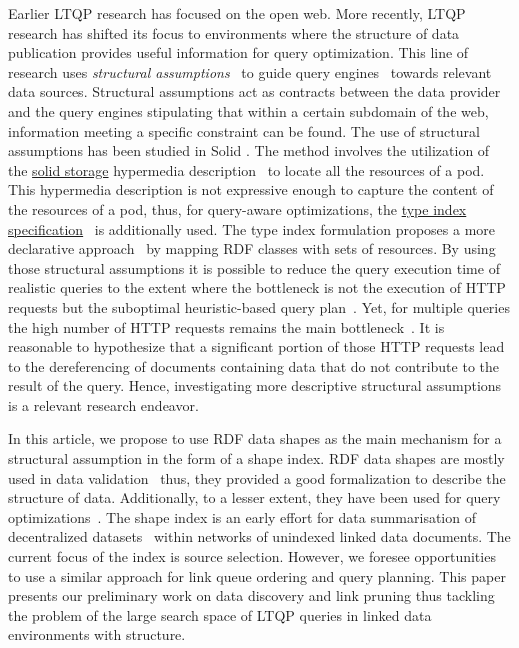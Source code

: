 Earlier LTQP research has focused on the open web.
More recently, LTQP research has shifted its focus to environments where the structure of data publication provides useful information for query optimization.
This line of research uses \emph{structural assumptions}~\cite{Taelman2023} to guide query engines~\cite{verborgh2020guided} towards relevant data sources.
Structural assumptions act as contracts between the data provider and the query engines stipulating that within a certain subdomain of the web, information meeting a specific constraint can be found.
The use of structural assumptions has been studied in Solid \cite{Taelman2023}.
The method involves the utilization of the 
\href{https://solidproject.org/TR/protocol#resources}{solid storage} hypermedia description~\cite{Fielding} to locate all the resources of a pod. 
This hypermedia description is not expressive enough to capture the content of the resources of a pod, thus, for query-aware optimizations, the \href{https://solid.github.io/type-indexes/}{type index specification}~ is additionally used.
The type index formulation proposes a more declarative approach~\cite{Taelman2017} by mapping RDF classes with sets of resources.
By using those structural assumptions it is possible to reduce the query execution time of realistic queries to the extent where the bottleneck is not the execution of HTTP requests but the suboptimal heuristic-based query plan~\cite{eschauzier_quweda_2023, Taelman2023}.
Yet, for multiple queries the high number of HTTP requests remains the main bottleneck~\cite{eschauzier_quweda_2023}.
It is reasonable to hypothesize that a significant portion of those HTTP requests lead to the dereferencing of documents containing data that do not contribute to the result of the query.
Hence, investigating more descriptive structural assumptions is a relevant research endeavor.

In this article, we propose to use RDF data shapes as the main mechanism for a structural assumption in the form of a shape index.
RDF data shapes are mostly used in data validation~\cite{Gayo2018a} thus, they provided a good formalization to describe the structure of data.
Additionally, to a lesser extent, they have been used for query optimizations~\cite{kashif2021}.
The shape index is an early effort for data summarisation of decentralized datasets~\cite{Stuckenschmidt2004,Goldman1997, Harth2010} within networks of unindexed linked data documents.
The current focus of the index is source selection.
However, we foresee opportunities to use a similar approach for link queue ordering and query planning.
This paper presents our preliminary work on data discovery and link pruning thus tackling the problem of the large search space of LTQP queries in linked data environments with structure.
